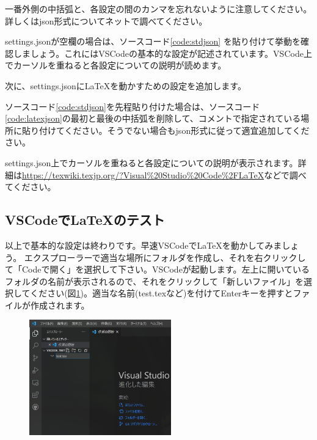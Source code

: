 一番外側の中括弧と、各設定の間のカンマを忘れないように注意してください。詳しくはjson形式についてネットで調べてください。

settings.jsonが空欄の場合は、ソースコード\ref{code:stdjson}
を貼り付けて挙動を確認しましょう。これにはVSCodeの基本的な設定が記述されています。VSCode上でカーソルを重ねると各設定についての説明が読めます。



次に、settings.jsonに\LaTeX を動かすための設定を追加します。

ソースコード\ref{code:stdjson}を先程貼り付けた場合は、ソースコード\ref{code:latexjson}の最初と最後の中括弧を削除して、コメントで指定されている場所に貼り付けてください。そうでない場合もjson形式に従って適宜追加してください。

settings.json上でカーソルを重ねると各設定についての説明が表示されます。詳細は\url{https://texwiki.texjp.org/?Visual%20Studio%20Code%2FLaTeX}などで調べてください。



\subsection{VSCodeで\LaTeX のテスト}
以上で基本的な設定は終わりです。早速VSCodeで\LaTeX を動かしてみましょう。
エクスプローラーで適当な場所にフォルダを作成し、それを右クリックして「Codeで開く」を選択して下さい。VSCodeが起動します。左上に開いているフォルダの名前が表示されるので、それをクリックして「新しいファイル」を選択してください(図\ref{fig:vsnewfile})。適当な名前(test.texなど)を付けてEnterキーを押すとファイルが作成されます。

\begin{figure}[H]
    \centering
    \includegraphics[height=50mm]{img/vscodetest0.png}
    \caption{}
    \label{fig:vsnewfile}
\end{figure}


